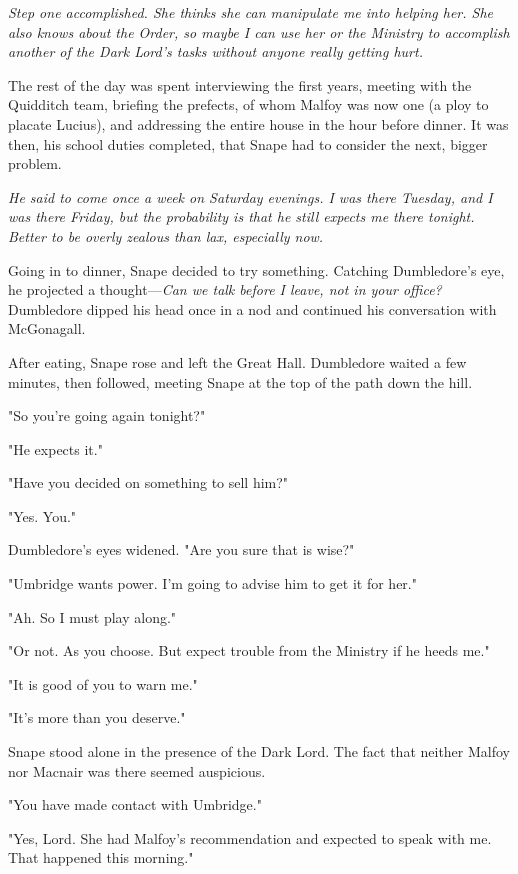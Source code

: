 \emph{Step one accomplished. She thinks she can manipulate me into helping her. She also knows about the Order, so maybe I can use her or the Ministry to accomplish another of the Dark Lord's tasks without anyone really getting hurt.}

The rest of the day was spent interviewing the first years, meeting with the Quidditch team, briefing the prefects, of whom Malfoy was now one (a ploy to placate Lucius), and addressing the entire house in the hour before dinner. It was then, his school duties completed, that Snape had to consider the next, bigger problem.

\emph{He said to come once a week on Saturday evenings. I was there Tuesday, and I was there Friday, but the probability is that he still expects me there tonight. Better to be overly zealous than lax, especially now.}

Going in to dinner, Snape decided to try something. Catching Dumbledore's eye, he projected a thought—\emph{Can we talk before I leave, not in your office?} Dumbledore dipped his head once in a nod and continued his conversation with McGonagall.

After eating, Snape rose and left the Great Hall. Dumbledore waited a few minutes, then followed, meeting Snape at the top of the path down the hill.

"So you're going again tonight?"

"He expects it."

"Have you decided on something to sell him?"

"Yes. You."

Dumbledore's eyes widened. "Are you sure that is wise?"

"Umbridge wants power. I'm going to advise him to get it for her."

"Ah. So I must play along."

"Or not. As you choose. But expect trouble from the Ministry if he heeds me."

"It is good of you to warn me."

"It's more than you deserve."

\sbreak

Snape stood alone in the presence of the Dark Lord. The fact that neither Malfoy nor Macnair was there seemed auspicious.

"You have made contact with Umbridge."

"Yes, Lord. She had Malfoy's recommendation and expected to speak with me. That happened this morning."

